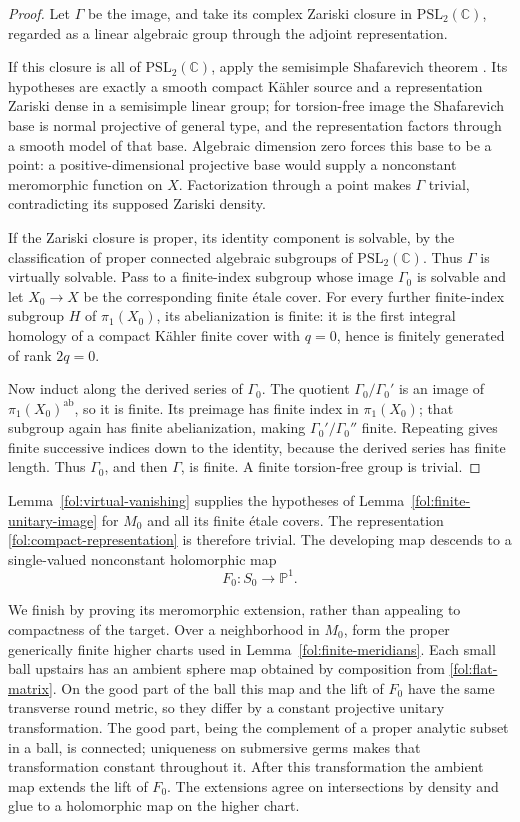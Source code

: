 \documentclass[11pt,letterpaper]{article}
\theoremstyle{definition}
\theoremstyle{remark}
\begin{document}
\begin{proof}
Let $\Gamma$ be the image, and take its complex Zariski closure in
$\mathrm{PSL}_2(\mathbb{C})$, regarded as a linear algebraic group through
the adjoint representation.

If this closure is all of $\mathrm{PSL}_2(\mathbb{C})$, apply the
semisimple Shafarevich theorem
\cite[Theorem~1]{CCE}.  Its hypotheses are exactly a smooth compact
K\"ahler source and a representation Zariski dense in a semisimple
linear group; for torsion-free image the Shafarevich base is normal
projective of general type, and the representation factors through
a smooth model of that base.  Algebraic dimension zero forces this
base to be a point: a positive-dimensional projective base would
supply a nonconstant meromorphic function on $X$.  Factorization
through a point makes $\Gamma$ trivial, contradicting its supposed
Zariski density.

If the Zariski closure is proper, its identity component is solvable,
by the classification of proper connected algebraic subgroups of
$\mathrm{PSL}_2(\mathbb{C})$.  Thus $\Gamma$ is virtually solvable.  Pass to
a finite-index subgroup whose image $\Gamma_0$ is solvable and let
$X_0\to X$ be the corresponding finite \'etale cover.
For every further finite-index subgroup $H$ of $\pi_1(X_0)$, its
abelianization is finite: it is the first integral homology of a
compact K\"ahler finite cover with $q=0$, hence is finitely generated
of rank $2q=0$.

Now induct along the derived series of $\Gamma_0$.
The quotient $\Gamma_0/\Gamma_0'$ is an image of
$\pi_1(X_0)^{\mathrm{ab}}$, so it is finite.
Its preimage has finite index in $\pi_1(X_0)$; that subgroup again
has finite abelianization, making $\Gamma_0'/\Gamma_0''$ finite.
Repeating gives finite successive indices down to the identity,
because the derived series has finite length.
Thus $\Gamma_0$, and then $\Gamma$, is finite.
A finite torsion-free group is trivial.
\end{proof}

Lemma~\ref{fol:virtual-vanishing} supplies the hypotheses of
Lemma~\ref{fol:finite-unitary-image} for $M_0$ and all its finite
\'etale covers.  The representation
\eqref{fol:compact-representation} is therefore trivial.  The
developing map descends to a single-valued nonconstant holomorphic map
\[
 F_0\colon S_0\longrightarrow\mathbb{P}^1.
\]

We finish by proving its meromorphic extension, rather than appealing
to compactness of the target.  Over a neighborhood in $M_0$, form the
proper generically finite higher charts used in
Lemma~\ref{fol:finite-meridians}.  Each small ball upstairs has an
ambient sphere map obtained by composition from
\eqref{fol:flat-matrix}.  On the good part of the ball this map and
the lift of $F_0$ have the same transverse round metric, so they differ
by a constant projective unitary transformation.  The good part,
being the complement of a proper analytic subset in a ball, is
connected; uniqueness on submersive germs makes that transformation
constant throughout it.  After this transformation the ambient map
extends the lift of $F_0$.  The extensions agree on intersections
by density and glue to a holomorphic map on the higher chart.
\end{document}
